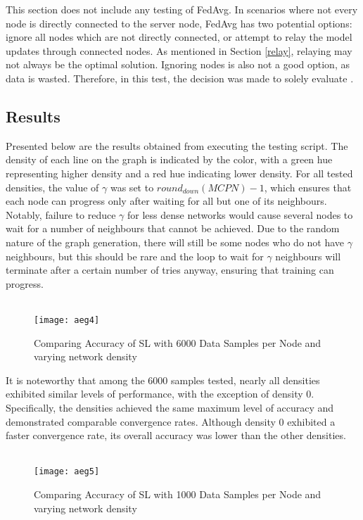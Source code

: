 This section does not include any testing of FedAvg. In scenarios where not every node is directly connected to the server node, FedAvg has two potential options: ignore all nodes which are not directly connected, or attempt to relay the model updates through connected nodes. As mentioned in Section \ref{relay}, relaying may not always be the optimal solution. Ignoring nodes is also not a good option, as data is wasted. Therefore, in this test, the decision was made to solely evaluate \SL.


\subsection{Results}
Presented below are the results obtained from executing the testing script. The density of each line on the graph is indicated by the color, with a green hue representing higher density and a red hue indicating lower density. For all tested densities, the value of $\gamma$ was set to $round_{down}(MCPN) - 1$, which ensures that each node can progress only after waiting for all but one of its neighbours. Notably, failure to reduce $\gamma$ for less dense networks would cause several nodes to wait for a number of neighbours that cannot be achieved. Due to the random nature of the graph generation, there will still be some nodes who do not have $\gamma$ neighbours, but this should be rare and the loop to wait for $\gamma$ neighbours will terminate after a certain number of tries anyway, ensuring that training can progress.

\begin{figure}[H] 
	 \\
	\texttt{[image: aeg4]}
	\caption{Comparing Accuracy of SL with 6000 Data Samples per Node and varying network density}
	\label{aeg4}
\end{figure}

It is noteworthy that among the 6000 samples tested, nearly all densities exhibited similar levels of performance, with the exception of density 0. Specifically, the densities achieved the same maximum level of accuracy and demonstrated comparable convergence rates. Although density 0 exhibited a faster convergence rate, its overall accuracy was lower than the other densities.

\begin{figure}[H]
	 \\
	\texttt{[image: aeg5]}
	\caption{Comparing Accuracy of SL with 1000 Data Samples per Node and varying network density}
	\label{aeg5}
\end{figure}

